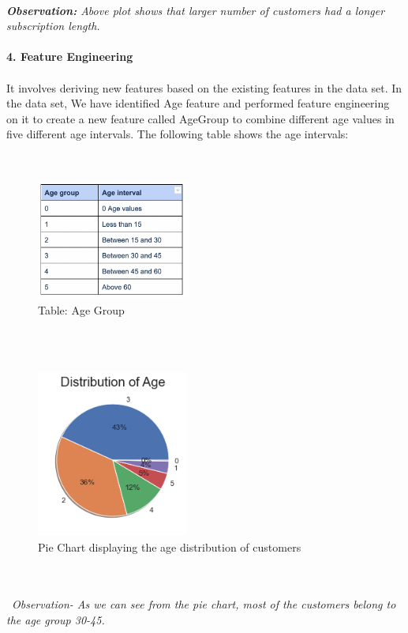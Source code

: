 \documentclass[a4paper, 10pt, conference]{ieeeconf}      %
\begin{document}
\\\textit{\textbf{Observation:} Above plot shows that larger number of customers had a longer subscription length.}
\\
\\
\textbf{4. Feature Engineering}
\\\
\\It involves deriving new features based on the existing features in the data set. In the data set, We have identified Age feature and performed feature engineering on it to create a new feature called AgeGroup to combine different age values in
five different age intervals. The following table shows the age intervals:

\\
\begin{figure}[htp]
    \centering
    \includegraphics[width=5cm,height=4cm]{Images/agegrouptable.png}
    \caption{Table: Age Group}
    \label{fig:agegrouptable}
\end{figure}

\\\
\begin{figure}[htp]
    \centering
    \includegraphics[width=5cm,height=5.5cm]{Images/distributionOfAge.png}
    \caption{Pie Chart displaying the age distribution of customers}
    \label{fig:distributionOfAge}
\end{figure}
\\\
\\\
\textit{Observation- As we can see from the pie chart, most of the customers belong to the age group 30-45.}
\end{document}
